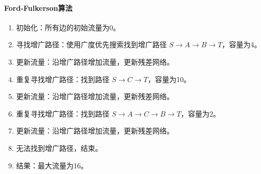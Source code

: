 \documentclass[UTF8]{ctexart}
\begin{document}
\paragraph{Ford-Fulkerson算法}
\begin{enumerate}
    \item 初始化：所有边的初始流量为0。
    \item 寻找增广路径：使用广度优先搜索找到增广路径 \( S \rightarrow A \rightarrow B \rightarrow T \)，容量为4。
    \item 更新流量：沿增广路径增加流量，更新残差网络。
    \item 重复寻找增广路径：找到路径 \( S \rightarrow C \rightarrow T \)，容量为10。
    \item 更新流量：沿增广路径增加流量，更新残差网络。
    \item 重复寻找增广路径：找到路径 \( S \rightarrow A \rightarrow C \rightarrow B \rightarrow T \)，容量为2。
    \item 更新流量：沿增广路径增加流量，更新残差网络。
    \item 无法找到增广路径，结束。
    \item 结果：最大流量为16。
\end{enumerate}
\end{document}
